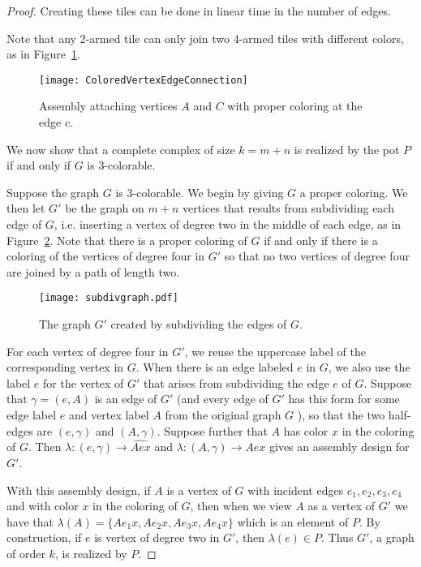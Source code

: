 \documentclass{elsarticle}
\theoremstyle{definition}
\theoremstyle{remark}
\theoremstyle{plain}
\theoremstyle{plain}
\begin{document}
\begin{proof}
      
Creating these tiles can be done in linear time in the number of edges.

Note that any 2-armed tile can only join two 4-armed tiles with different colors, as in Figure~\ref{ColoredVE}.
\begin{figure}
      \centering \texttt{[image: ColoredVertexEdgeConnection]} \caption{Assembly attaching vertices $A$ and $C$ with proper coloring at the edge $c$.}
      \label{ColoredVE}
      \end{figure}
We now show that a complete complex of size $k=m+n$ is realized by the pot $P$ if and only if $G$ is 3-colorable.

Suppose the graph $G$ is 3-colorable.  We begin by giving $G$ a proper coloring.  We then let $G'$ be the graph on $m+n$ vertices that results from subdividing each edge of $G$, i.e. inserting a vertex of degree two in the middle of each edge, as in Figure~\ref{subdiv}. Note that there is a proper coloring of $G$ if and only if there is a coloring of the vertices of degree four in $G'$ so that no two vertices of degree four are joined by a path of length two.

\begin{figure}
  \centering   
  \texttt{[image: subdivgraph.pdf]}
  \caption{The graph $G'$ created by subdividing the edges of $G$.}
  \label{subdiv}
  \end{figure} 
  
For each vertex of degree four in  $G'$, we reuse the uppercase label of the corresponding vertex in $G$.  When there is an edge labeled $e$ in $G$, we also use the label $e$ for the vertex of $G'$ that arises from subdividing the edge $e$ of $G$.  Suppose that $\gamma = (e,A)$ is an edge of $G'$ (and every edge of $G'$ has this form for some edge label $e$ and vertex label $A$ from the original graph $G$ ), so that the two half-edges are $(e,\gamma)$ and $(A,\gamma)$.  Suppose further that   $A$ has color $x$ in the coloring of $G$.  Then $\lambda: (e,\gamma) \rightarrow  \widehat{Aex}$ and $\lambda: (A, \gamma) \rightarrow  Aex$ gives an assembly design for $G'$. 

With this assembly design, if $A$ is a vertex of $G$ with incident edges $e_1, e_2, e_3, e_4$ and  with  color $x$ in the coloring of $G$, then when we view $A$ as a vertex of $G'$ we have that $\lambda(A) = \{ Ae_1x, Ae_2x, Ae_3x, Ae_4x\} $ which is an element of $P$.  By construction, if $e$ is vertex of degree two in $G'$, then $\lambda(e) \in P$.   Thus $G'$, a graph of order $k$, is realized by $P$. 


\end{proof}
\end{document}
